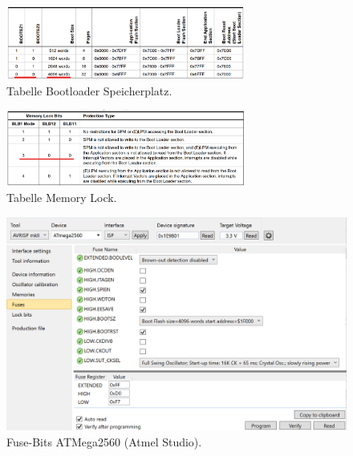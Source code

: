 
\begin{figure}[H]
	\centering
	\includegraphics[width=0.7\textwidth]{graphics/Tabelle_Bootloader}
	\caption{Tabelle Bootloader Speicherplatz.\cite[S.320]{atmel_atmel_2014}}
	\label{fig:Tabelle_Bootloader}
\end{figure}

\begin{figure}[H]
	\centering
	\includegraphics[width=0.7\textwidth]{graphics/Tabelle_Memory_Lock}
	\caption{Tabelle Memory Lock.\cite[S.326]{atmel_atmel_2014}}
	\label{fig:Tabelle_Memory_Lock}
\end{figure}

\begin{figure}[H]
	\centering
	\includegraphics[width=\textwidth]{graphics/AtmelStudio_Fuses}
	\caption{Fuse-Bits ATMega2560 (Atmel Studio).}
	\label{fig:AtmelStudio_Fuses}
\end{figure}

